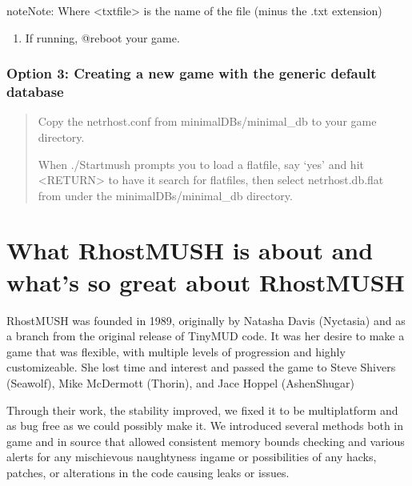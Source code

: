 \documentclass[letterpaper,10pt,english]{sphinxmanual}
\begin{document}
\begin{sphinxadmonition}{note}{Note:}
\sphinxAtStartPar
Where \textless{}txtfile\textgreater{} is the name of the file (minus the .txt extension)
\end{sphinxadmonition}
\begin{enumerate}
%
\item {} 
\sphinxAtStartPar
If running, @reboot your game.

\end{enumerate}


\subsection{Option 3: Creating a new game with the generic default database}
\label{\detokenize{install:option-3-creating-a-new-game-with-the-generic-default-database}}\begin{quote}

\sphinxAtStartPar
Copy the netrhost.conf from minimal\sphinxhyphen{}DBs/minimal\_db to your game directory.

\sphinxAtStartPar
When ./Startmush prompts you to load a flatfile, say ‘yes’ and hit \textless{}RETURN\textgreater{}
to have it search for flatfiles, then select netrhost.db.flat from under
the minimal\sphinxhyphen{}DBs/minimal\_db directory.
\end{quote}


\chapter{What RhostMUSH is about and what’s so great about RhostMUSH}
\label{\detokenize{features:what-rhostmush-is-about-and-what-s-so-great-about-rhostmush}}\label{\detokenize{features::doc}}
\sphinxAtStartPar
RhostMUSH was founded in 1989, originally by Natasha Davis (Nyctasia) and as
a branch from the original release of TinyMUD code.  It was her desire to make
a game that was flexible, with multiple levels of progression and highly
customizeable.  She lost time and interest and passed the game to
Steve Shivers (Seawolf), Mike McDermott (Thorin), and Jace Hoppel (Ashen\sphinxhyphen{}Shugar)

\sphinxAtStartPar
Through their work, the stability improved, we fixed it to be multi\sphinxhyphen{}platform
and as bug free as we could possibly make it.  We introduced several methods both
in game and in source that allowed consistent memory bounds checking and
various alerts for any mischievous naughtyness in\sphinxhyphen{}game or possibilities of any
hacks, patches, or alterations in the code causing leaks or issues.
\end{document}
